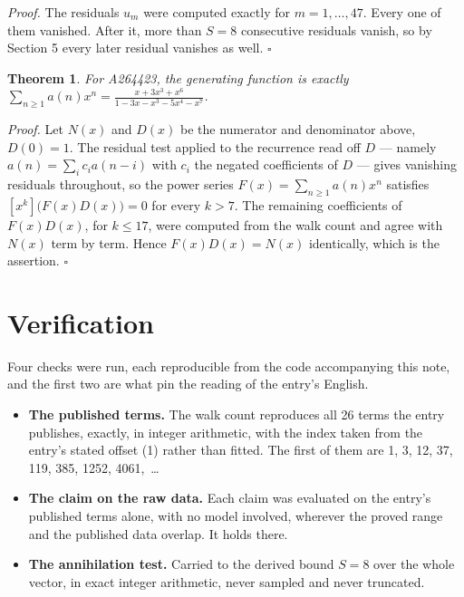 \documentclass[11pt]{article}
\newtheorem{theorem}{Theorem}
\theoremstyle{definition}
\begin{document}
{\itshape Proof.} The residuals $u_m$ were computed exactly for $m = 1,\dots,47$. Every one of them vanished. After it, more than $S = 8$ consecutive residuals vanish, so by Section 5 every later residual vanishes as well. $\square$

\begin{theorem} For A264423, the generating function is exactly $\sum_{n\ge 1} a(n)x^n = \frac{x + 3x^{3} + x^{6}}{1 - 3x - x^{3} - 5x^{4} - x^{7}}$.\end{theorem}

{\itshape Proof.} Let $N(x)$ and $D(x)$ be the numerator and denominator above, $D(0)=1$. The residual test applied to the recurrence read off $D$ --- namely $a(n) = \sum_i c_i a(n-i)$ with $c_i$ the negated coefficients of $D$ --- gives vanishing residuals throughout, so the power series $F(x)=\sum_{n\ge 1}a(n)x^n$ satisfies $[x^k]\bigl(F(x)D(x)\bigr) = 0$ for every $k > 7$. The remaining coefficients of $F(x)D(x)$, for $k \le 17$, were computed from the walk count and agree with $N(x)$ term by term. Hence $F(x)D(x) = N(x)$ identically, which is the assertion. $\square$

\section{Verification}

Four checks were run, each reproducible from the code accompanying this note, and the first two are what pin the reading of the entry's English.

\begin{itemize}

\item {\bfseries The published terms.} The walk count reproduces all 26 terms the entry publishes, exactly, in integer arithmetic, with the index taken from the entry's stated offset (1) rather than fitted. The first of them are 1, 3, 12, 37, 119, 385, 1252, 4061,~\dots

\item {\bfseries The claim on the raw data.} Each claim was evaluated on the entry's published terms alone, with no model involved, wherever the proved range and the published data overlap. It holds there.

\item {\bfseries The annihilation test.} Carried to the derived bound $S = 8$ over the whole vector, in exact integer arithmetic, never sampled and never truncated.

\end{itemize}
\end{document}
